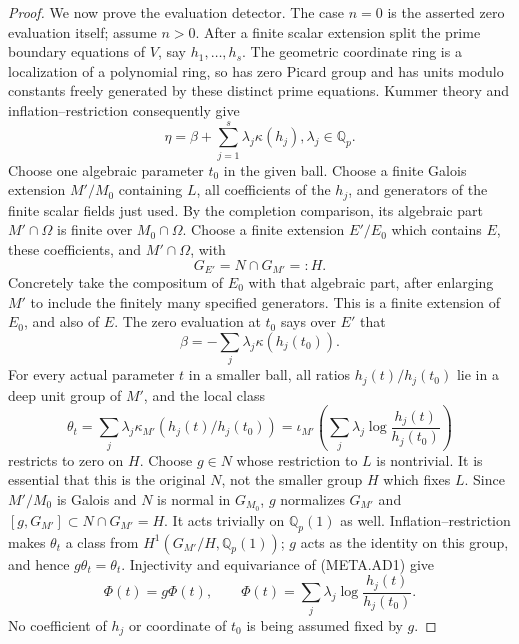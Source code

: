 \begin{proof}
We now prove the evaluation detector.
The case $n=0$ is the asserted zero evaluation itself;
assume $n>0$.
After a finite scalar extension split the prime
boundary equations of $V$, say $h_1,\ldots,h_s$.
The geometric coordinate ring is a localization of
a polynomial ring, so has zero Picard group and has
units modulo constants freely generated by these
distinct prime equations.
Kummer theory and inflation--restriction consequently
give
\[
              \eta=\beta+\sum_{j=1}^s\lambda_j\kappa(h_j),
                         \lambda_j\in\mathbb Q_p.             \tag{META.AD4}
\]
Choose one algebraic parameter $t_0$ in the given ball.
Choose a finite Galois extension $M'/M_0$ containing
$L$, all coefficients of the $h_j$, and generators of
the finite scalar fields just used.
By the completion comparison, its algebraic part
$M'\cap\Omega$ is finite over $M_0\cap\Omega$.
Choose a finite extension $E'/E_0$ which contains $E$,
these coefficients, and $M'\cap\Omega$, with
\[
                       G_{E'}=N\cap G_{M'}=:H.
\]
Concretely take the compositum of $E_0$ with that
algebraic part, after enlarging $M'$ to include the
finitely many specified generators.  This is a finite
extension of $E_0$, and also of $E$.
The zero evaluation at $t_0$ says over $E'$ that
\[
                  \beta=-\sum_j\lambda_j\kappa(h_j(t_0)).
\]
For every actual parameter $t$ in a smaller ball,
all ratios $h_j(t)/h_j(t_0)$ lie in a deep unit group
of $M'$, and the local class
\[
 \theta_t=\sum_j\lambda_j
                   \kappa_{M'}(h_j(t)/h_j(t_0))
          =\iota_{M'}\left(
                \sum_j\lambda_j\log\frac{h_j(t)}{h_j(t_0)}
                         \right)                              \tag{META.AD5}
\]
restricts to zero on $H$.
Choose $g\in N$ whose restriction to $L$ is nontrivial.
It is essential that this is the original $N$, not the
smaller group $H$ which fixes $L$.
Since $M'/M_0$ is Galois and $N$ is normal in $G_{M_0}$,
$g$ normalizes $G_{M'}$ and
$[g,G_{M'}]\subset N\cap G_{M'}=H$.
It acts trivially on $\mathbb Q_p(1)$ as well.
Inflation--restriction makes $\theta_t$ a class from
$H^1(G_{M'}/H,\mathbb Q_p(1))$; $g$ acts as the identity
on this group, and hence $g\theta_t=\theta_t$.
Injectivity and equivariance of (META.AD1) give
\[
 \Phi(t)=g\Phi(t),\qquad
            \Phi(t)=\sum_j\lambda_j\log\frac{h_j(t)}{h_j(t_0)}.
                                                               \tag{META.AD6}
\]
No coefficient of $h_j$ or coordinate of $t_0$ is being
assumed fixed by $g$.


\end{proof}
